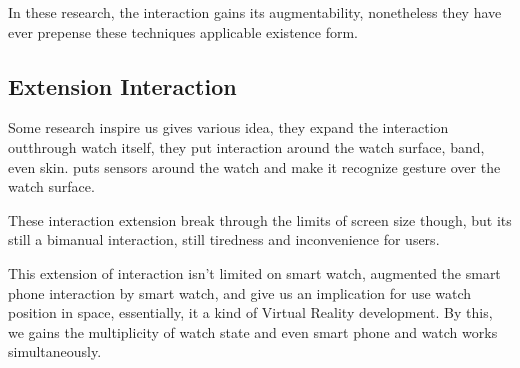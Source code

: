 In these research, the interaction gains its augmentability, nonetheless they have ever prepense these techniques applicable existence form.

\subsection{Extension Interaction}

Some research inspire us gives various idea, they expand the interaction outthrough watch itself, they put interaction around the watch surface\cite{Knibbe:2014:EIS:2559206.2581315,Kratz:2009:HEA:1613858.1613912}, band\cite{Perrault:2013:WSG:2470654.2466192}, even skin\cite{Ogata:2015:SSG:2735711.2735830}. \cite{kim2007gesture} puts sensors around the watch and make it recognize gesture over the watch surface.

These interaction extension break through the limits of screen size though,  but its still a bimanual interaction, still tiredness and inconvenience for users.



This extension of interaction isn't limited on smart watch, \cite{Chen:2014:DEJ:2556288.2556955} augmented the smart phone interaction by smart watch, and \cite{Yang:2014:MIS:2638728.2638848} give us an implication for use watch position in space, essentially, it a kind of Virtual Reality development. By this, we gains the multiplicity of watch state and even smart phone and watch works simultaneously.

